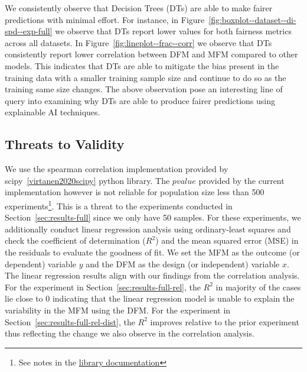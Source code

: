 \documentclass{article}
\begin{document}
We consistently observe that Decision Trees (DTs) are able to make
fairer predictions with minimal effort. For instance, in
Figure \ref{fig:boxplot--dataset--di-spd--exp-full} we observe that
DTs report lower values for both fairness metrics across all
datasets. In Figure \ref{fig:lineplot--frac--corr} we observe that DTs
consistently report lower correlation between DFM and MFM compared to
other models. This indicates that DTs are able to mitigate the bias
present in the training data with a smaller training sample size and
continue to do so as the training same size changes. The above
observation pose an interesting line of query into examining why DTs
are able to produce fairer predictions using explainable AI
techniques.

\subsection{Threats to Validity}\label{sec:threats}

We use the spearman correlation implementation provided by
scipy \ref{virtanen2020scipy} python library. The $pvalue$ provided by
the current implementation however is not reliable for population size
less than 500 experiments\footnote{See notes in the
\href{https://docs.scipy.org/doc/scipy/reference/generated/scipy.stats.spearmanr.html}{library
  documentation}}. This is a threat to the experiments conducted in
Section \ref{sec:results-full} since we only have 50 samples. For
these experiments, we additionally conduct linear regression analysis
using ordinary-least squares and check the coefficient of
determination ($R^2$) and the mean squared error (MSE) in the
residuals to evaluate the goodness of fit. We set the MFM as the
outcome (or dependent) variable $y$ and the DFM as the design (or
independent) variable $x$. The linear regression results align with
our findings from the correlation analysis. For the experiment in
Section \ref{sec:results-full-rel}, the $R^2$ in majority of the cases
lie close to 0 indicating that the linear regression model is unable
to explain the variability in the MFM using the DFM. For the
experiment in Section \ref{sec:results-full-rel-dist}, the $R^2$
improves relative to the prior experiment thus reflecting the change
we also observe in the correlation analysis.
\end{document}
